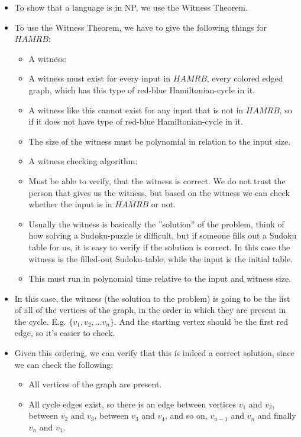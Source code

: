 \begin{itemize}
    \item To show that a language is in NP, we use the Witness Theorem.
    \item To use the Witness Theorem, we have to give the following things for $HAMRB$:
    \begin{itemize}
        \item A witness:
            \item A witness must exist for every input in $HAMRB$, every colored edged graph, which has this type of red-blue Hamiltonian-cycle in it.
            \item A witness like this cannot exist for any input that is not in $HAMRB$, so if it does not have type of red-blue Hamiltonian-cycle in it.
            \item The size of the witness must be polynomial in relation to the input size.
        \item A witness checking algorithm:
            \item Must be able to verify, that the witness is correct. We do not trust the person that gives us the witness, but based on the witness we can check whether the input is in $HAMRB$ or not.
            \item Usually the witness is basically the ''solution'' of the problem, think of how solving a Sudoku-puzzle is difficult, but if someone fills out a Sudoku table for us, it is easy to verify if the solution is correct. In this case the witness is the filled-out Sudoku-table, while the input is the initial table.
            \item This must run in polynomial time relative to the input and witness size.
    \end{itemize}
    \item In this case, the witness (the solution to the problem) is going to be the list of all of the vertices of the graph, in the order in which they are present in the cycle. E.g. $\{v_1,v_2,\dots{}v_n\}$. And the starting vertex should be the first red edge, so it's easier to check.
    \item Given this ordering, we can verify that this is indeed a correct solution, since we can check the following:
    \begin{itemize}
        \item All vertices of the graph are present.
        \item All cycle edges exist, so there is an edge between vertices $v_1$ and $v_2$, between $v_2$ and $v_3$, between $v_3$ and $v_4$, and so on, $v_{n-1}$ and $v_n$ and finally $v_n$ and $v_1$.

\end{itemize}
\end{itemize}

